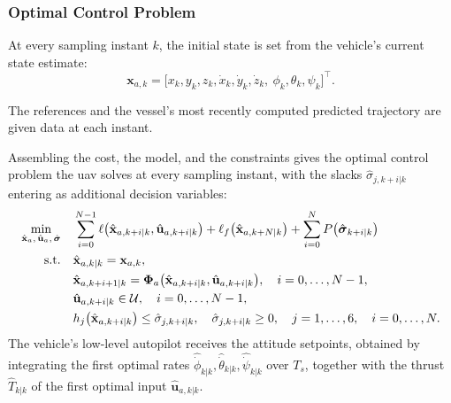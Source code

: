\subsubsection*{Optimal Control Problem}

At every sampling instant $k$, the initial state is set from the vehicle's current state estimate:
\begin{equation}
    \mathbf{x}_{a,k} = \big[x_k,y_k,z_k,\dot x_k,\dot y_k,\dot z_k,\ \phi_k,\theta_k,\psi_k\big]^\top.
    \label{eq:uav_mpc_initial_condition}
\end{equation}

The references and the vessel's most recently computed predicted trajectory are given data at each instant.

Assembling the cost, the model, and the constraints gives the optimal control problem the \gls{uav} solves at every sampling instant, with the slacks $\hat\sigma_{j,k+i|k}$ entering as additional decision variables:
\begin{align}
    \min_{\hat{\mathbf{x}}_a,\,\hat{\mathbf{u}}_a,\,\hat{\boldsymbol\sigma}} \quad & \sum_{i=0}^{N-1} \ell\big(\hat{\mathbf{x}}_{a,k+i|k},\hat{\mathbf{u}}_{a,k+i|k}\big) + \ell_f\big(\hat{\mathbf{x}}_{a,k+N|k}\big) + \sum_{i=0}^{N} P\big(\hat{\boldsymbol\sigma}_{k+i|k}\big) \notag \\
    \text{s.t.} \quad & \hat{\mathbf{x}}_{a,k|k} = \mathbf{x}_{a,k}, \notag \\
    & \hat{\mathbf{x}}_{a,k+i+1|k} = \boldsymbol\Phi_a\big(\hat{\mathbf{x}}_{a,k+i|k},\hat{\mathbf{u}}_{a,k+i|k}\big), \quad i=0,\dots,N-1, \notag \\
    & \hat{\mathbf{u}}_{a,k+i|k} \in \mathcal{U}, \quad i=0,\dots,N-1, \notag \\
    & h_j\big(\hat{\mathbf{x}}_{a,k+i|k}\big) \le \hat\sigma_{j,k+i|k}, \quad \hat\sigma_{j,k+i|k} \ge 0, \quad j=1,\dots,6, \quad i=0,\dots,N. \label{eq:uav_mpc_ocp}
\end{align}
The vehicle's low-level autopilot receives the attitude setpoints, obtained by integrating the first optimal rates $\hat{\dot\phi}_{k|k}, \hat{\dot\theta}_{k|k}, \hat{\dot\psi}_{k|k}$ over $T_s$, together with the thrust $\hat{T}_{k|k}$ of the first optimal input $\hat{\mathbf{u}}_{a,k|k}$.